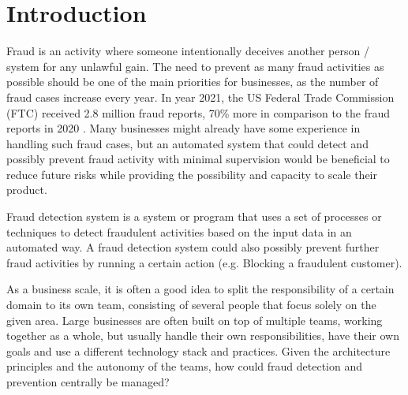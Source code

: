 \chapter{Introduction}

Fraud is an activity where someone intentionally deceives another person / system for any unlawful gain. The need to prevent as many fraud activities as possible should be one of the main priorities for businesses, as the number of fraud cases increase every year. In year 2021, the US Federal Trade Commission (FTC) received 2.8 million fraud reports, 70\% more in comparison to the fraud reports in 2020 \autocite{ftc}. Many businesses might already have some experience in handling such fraud cases, but an automated system that could detect and possibly prevent fraud activity with minimal supervision would be beneficial to reduce future risks while providing the possibility and capacity to scale their product.

Fraud detection system is a system or program that uses a set of processes or techniques to detect fraudulent activities based on the input data in an automated way. A fraud detection system could also possibly prevent further fraud activities by running a certain action (e.g. Blocking a fraudulent customer). 

As a business scale, it is often a good idea to split the responsibility of a certain domain to its own team, consisting of several people that focus solely on the given area. Large businesses are often built on top of multiple teams, working together as a whole, but usually handle their own responsibilities, have their own goals and use a different technology stack and practices. Given the architecture principles and the autonomy of the teams, how could fraud detection and prevention centrally be managed?



